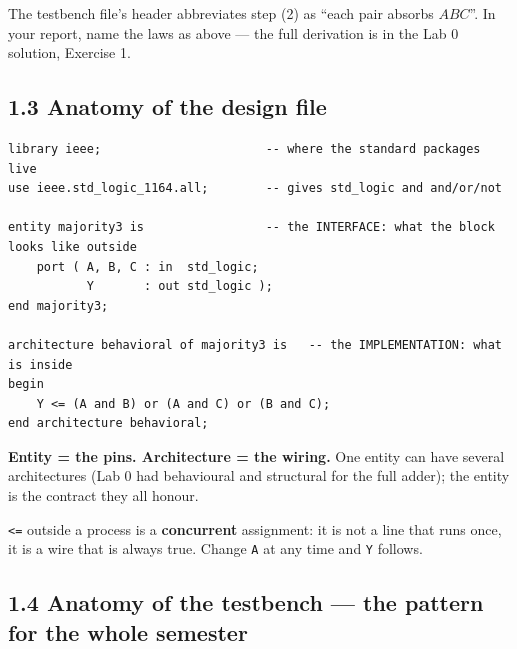\documentclass[11pt]{article}
\newcommand{\code}[1]{\texttt{#1}}
\begin{document}
The testbench file's header abbreviates step (2) as ``each pair absorbs $ABC$''.
In your report, name the laws as above --- the full derivation is in the Lab 0
solution, Exercise 1.

\subsection*{1.3 Anatomy of the design file}

\begin{lstlisting}
library ieee;                       -- where the standard packages live
use ieee.std_logic_1164.all;        -- gives std_logic and and/or/not

entity majority3 is                 -- the INTERFACE: what the block looks like outside
    port ( A, B, C : in  std_logic;
           Y       : out std_logic );
end majority3;

architecture behavioral of majority3 is   -- the IMPLEMENTATION: what is inside
begin
    Y <= (A and B) or (A and C) or (B and C);
end architecture behavioral;
\end{lstlisting}

\textbf{Entity = the pins. Architecture = the wiring.} One entity can have several
architectures (Lab 0 had behavioural and structural for the full adder); the entity
is the contract they all honour.

\code{<=} outside a process is a \textbf{concurrent} assignment: it is not a line
that runs once, it is a wire that is always true. Change \code{A} at any time and
\code{Y} follows.

\subsection*{1.4 Anatomy of the testbench --- the pattern for the whole semester}
\end{document}
